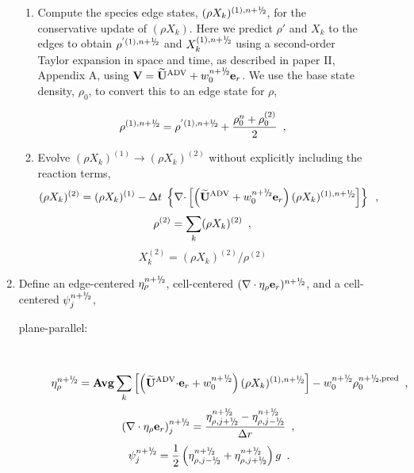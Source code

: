 \begin{description}
\begin{enumerate}
\begin{enumerate}
  \item Compute the species edge states, $(\rho X_k)^{(1),\nph}$, for
    the conservative update of $(\rho X_k)$.  Here we predict $\rho'$ 
    and $X_k$ to the edges to obtain $\rho^{'(1),\nph}$ and 
    $X_k^{(1),\nph}$ using a second-order Taylor expansion in
    space and time, as described in paper II, Appendix A, using $\Vb =
    \uadvtwo+w_0^{\nph} \er$.  We use the base
    state density, $\rho_0$, to convert this to an edge state for $\rho$,

\begin{equation}
\rho^{(1),\nph} = \rho^{'(1),\nph} + \frac{\rho_0^n + \rho_0^{(2)}}{2}\enskip ,
\end{equation}

    \item Evolve $(\rho X_k)^{(1)} \rightarrow (\rho X_k)^{(2)}$
      without explicitly including the reaction terms,
\begin{equation}
(\rho X_k)^{(2)} = (\rho X_k)^{(1)} 
- \dt \; \left\{ \nablab \cdotb \left[\left(\uadvtwo+w_0^{\nph} \er\right)  
(\rho X_k)^{(1),\nph} \right] \right\}  \enskip ,
\end{equation}
\begin{equation}
\rho^{(2)} = \sum_k (\rho X_k)^{(2)} \enskip ,
\end{equation}
\begin{equation}
X_k^{(2)} = (\rho X_k)^{(2)} / \rho^{(2)}
\end{equation}


   \end{enumerate}

\item Define an edge-centered $\etarho^{\nph}$, cell-centered 
$(\nabla\cdot\etarho\er)^{\nph}$, and a cell-centered $\psi_j^{\nph}$,

\begin{description}

\item[plane-parallel:] ~

\begin{equation}
 \etarho^{\nph} = {\rm {\bf Avg}} \sum_k \left [\left(\uadvtwo \cdotb \er + w_0^{\nph}\right) (\rho X_k)^{(1),\nph} \right] - w_0^{\nph} \rho_0^{\nph,{\rm pred}} \enskip ,
\end{equation}
\begin{equation}
(\nabla\cdot\etarho\er)_j^{\nph} = \frac{\eta_{\rho,j+\myhalf}^{\nph} - \eta_{\rho,j-\myhalf}^{\nph}}{\Delta r} \enskip , \\
\end{equation}
\begin{equation}
 \psi_j^{\nph} = \frac{1}{2} \left(\eta_{\rho,j-\myhalf}^{\nph} + \eta_{\rho,j+\myhalf}^{\nph}\right) g \enskip .
\end{equation}


\end{description}
\end{enumerate}
\end{description}
